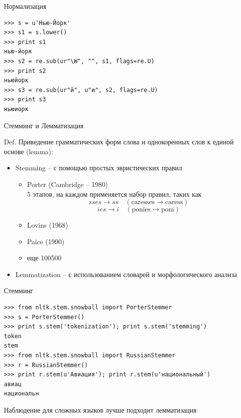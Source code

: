\documentclass[10pt]{beamer}
\begin{document}

\begin{frame}[fragile]{Нормализация}

\begin{shaded}
{\color{green}
\begin{verbatim}
>>> s = u'Нью-Йорк'
>>> s1 = s.lower()
>>> print s1
нью-йорк
>>> s2 = re.sub(ur"\W", "", s1, flags=re.U)
>>> print s2
ньюйорк
>>> s3 = re.sub(ur"й", u"и", s2, flags=re.U)
>>> print s3
ньюиорк
\end{verbatim}}
\end{shaded}

\end{frame}


\begin{frame}{Стемминг и Лемматизация}

\begin{block}{Def.}
Приведение грамматических форм слова и однокоренных слов к единой основе (lemma): 
\begin{itemize}
\item Stemming -- с помощью простых эвристических правил
\begin{itemize}
\item Porter (Cambridge -- 1980) \\
5 этапов, на каждом применяется набор правил, таких как
\[
sses \rightarrow ss \quad (\text{caresses}\rightarrow\text{caress})
\]
\[
ies \rightarrow i \quad (\text{ponies}\rightarrow\text{poni})
\]
\item Lovins (1968)
\item Paice (1990)
\item еще 100500
\end{itemize}
\item Lemmatization -- с использованием словарей и морфологического анализа
\end{itemize}
\end{block}

\end{frame}


\begin{frame}[fragile]{Стемминг}

\begin{shaded}
{\color{green}
\begin{verbatim}
>>> from nltk.stem.snowball import PorterStemmer
>>> s = PorterStemmer()
>>> print s.stem('tokenization'); print s.stem('stemming')
token
stem
>>> from nltk.stem.snowball import RussianStemmer
>>> r = RussianStemmer()
>>> print r.stem(u'Авиация'); print r.stem(u'национальный')
авиац
национальн
\end{verbatim}}
\end{shaded}

\begin{block}{Наблюдение}
для сложных языков лучше подходит лемматизация
\end{block}

\end{frame}
\end{document}
